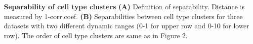 \textbf{Separability of cell type clusters}
\textbf{(A)} Definition of separability. Distance is measured by 1-corr.coef.
\textbf{(B)} Separabilities between cell type clusters for three datasets with two different dynamic ranges (0-1 for upper row and 0-10 for lower row).  The order of cell type clusters are same as in Figure 2.